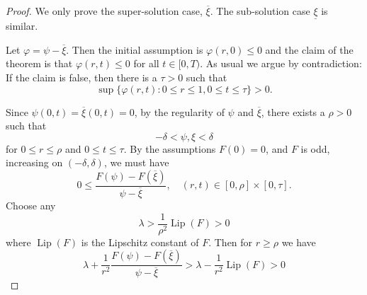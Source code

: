 \documentclass{amsart}
\begin{document}
\begin{proof}
We only prove the super-solution case, \(\overline{\xi}\). The sub-solution case \(\underline{\xi}\) is similar.

Let \(\varphi = \psi - \overline{\xi}\). Then the initial assumption is \(\varphi(r, 0) \leq 0\) and the claim of the theorem is that \(\varphi(r, t) \leq 0\) for all \(t \in [0, T)\). As usual we argue by contradiction: If the claim is false, then there is a \(\tau > 0\) such that
\begin{equation}
\label{eq:false_claim}
\sup \{\varphi(r, t) : 0 \leq r \leq 1, 0 \leq t \leq \tau\} > 0.
\end{equation}

Since \(\psi(0, t) = \overline{\xi}(0, t) = 0\), by the regularity of \(\psi\) and \(\overline{\xi}\), there exists a \(\rho > 0\) such that
\[
-\delta < \psi, \xi < \delta
\]
for \(0 \leq r \leq \rho\) and \(0 \leq t \leq \tau\). By the assumptions \(F(0) = 0\), and \(F\) is odd, increasing on \((-\delta,\delta)\), we must have
\begin{equation}
\label{eq:near_positive}
0 \leq \frac{F(\psi) - F(\overline{\xi})}{\psi - \overline{\xi}}, \quad (r, t) \in [0, \rho] \times [0, \tau].
\end{equation}
Choose any
\[
\lambda > \frac{1}{\rho^2} \operatorname{Lip} (F) > 0
\]
where \(\operatorname{Lip} (F)\) is the Lipschitz constant of \(F\). Then for  \(r \geq \rho\) we have
\begin{equation}
\label{eq:far_positive}
\lambda + \frac{1}{r^2} \frac{F(\psi) - F(\overline{\xi})}{\psi - \overline{\xi}} > \lambda - \frac{1}{r^2} \operatorname{Lip} (F) > 0
\end{equation}


\end{proof}
\end{document}
